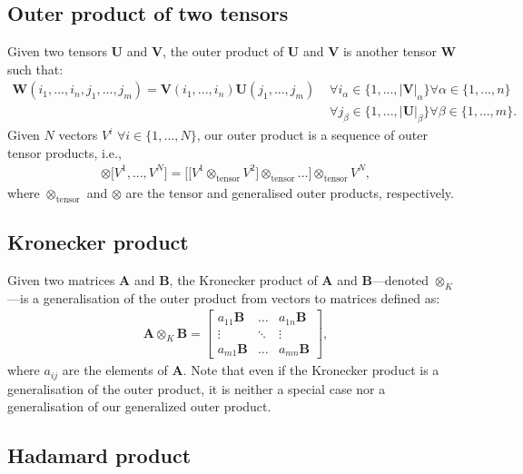 \documentclass[twoside,11pt]{article}
\begin{document}
\subsection*{Outer product of two tensors}

Given two tensors $\bm{U}$ and $\bm{V}$, the outer product of $\bm{U}$ and $\bm{V}$ is another tensor $\bm{W}$ such that:
\begin{align}
\bm{W}(i_1,...,i_n,j_1,...,j_m) = \bm{V}(i_1,...,i_n)\bm{U}(j_1,...,j_m) \,\, &\forall i_\alpha \in \{1, ..., |\bm{V}|_\alpha \} \forall \alpha \in \{1, ..., n\}\nonumber\\
&\forall j_\beta \in \{1, ..., |\bm{U}|_\beta \} \forall \beta \in \{1, ..., m\}.
\end{align}
Given $N$ vectors $V^i \,\, \forall i \in \{1, ..., N\}$, our outer product is a sequence of outer tensor products, i.e.,
\begin{align}
\otimes \Big[ V^1, ..., V^N \Big] = \Bigg[\Big[V^1 \otimes_{\text{tensor}} V^2 \Big] \otimes_{\text{tensor}} ... \Bigg] \otimes_{\text{tensor}} V^N,
\end{align}
where $\otimes_{\text{tensor}}$ and $\otimes$ are the tensor and generalised outer products, respectively.

\subsection*{Kronecker product}

Given two matrices $\bm{A}$ and $\bm{B}$, the Kronecker product of $\bm{A}$ and $\bm{B}$---denoted $\otimes_K$---is a generalisation of the outer product from vectors to matrices defined as:
\begin{align}
\bm{A} \otimes_K \bm{B} = \begin{bmatrix}
a_{11}\bm{B} & \ldots & a_{1n}\bm{B}\\
\vdots & \ddots & \vdots\\
a_{m1}\bm{B} & \ldots & a_{mn}\bm{B}
\end{bmatrix},
\end{align}
where $a_{ij}$ are the elements of $\bm{A}$. Note that even if the Kronecker product is a generalisation of the outer product, it is neither a special case nor a generalisation of our generalized outer product.

\subsection*{Hadamard product}
\end{document}
